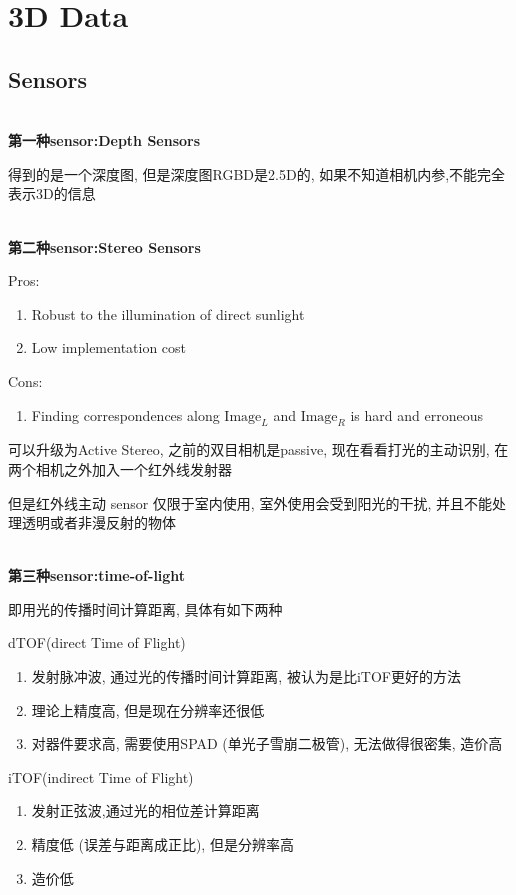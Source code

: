 \chapter{3D Data}

\section{Sensors}

\textbf{\\第一种sensor:Depth Sensors}

得到的是一个深度图, 但是深度图RGBD是2.5D的, 如果不知道相机内参,不能完全表示3D的信息

\textbf{\\第二种sensor:Stereo Sensors}

Pros:

\begin{enumerate}
    \item Robust to the illumination of direct sunlight
    \item Low implementation cost
\end{enumerate}

Cons:

\begin{enumerate}
    \item Finding correspondences along $\text{Image}_L$ and $\text{Image}_R$ is hard and erroneous
\end{enumerate}

可以升级为Active Stereo, 之前的双目相机是passive, 现在看看打光的主动识别, 在两个相机之外加入一个红外线发射器

但是红外线主动 sensor 仅限于室内使用, 室外使用会受到阳光的干扰, 并且不能处理透明或者非漫反射的物体

\textbf{\\第三种sensor:time-of-light}

即用光的传播时间计算距离, 具体有如下两种

dTOF(direct Time of Flight)
\begin{enumerate}
    \item 发射脉冲波, 通过光的传播时间计算距离, 被认为是比iTOF更好的方法
    \item 理论上精度高, 但是现在分辨率还很低
    \item 对器件要求高, 需要使用SPAD (单光子雪崩二极管), 无法做得很密集, 造价高
\end{enumerate}

iTOF(indirect Time of Flight)
\begin{enumerate}
    \item 发射正弦波,通过光的相位差计算距离
    \item 精度低 (误差与距离成正比), 但是分辨率高
    \item 造价低
\end{enumerate}

